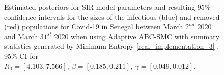 \documentclass[11pt,a4paper]{article}
\theoremstyle{break}
\begin{document}
  \begin{figure}[H]
    \centering
    \caption{Estimated posteriors for SIR model parameters and resulting 95\% confidence intervals for the sizes of the infectious (blue) and removed (red) populations for Covid-19 in Senegal between March $2^{nd}$ 2020 and March $31^{st}$ 2020 when using Adaptive ABC-SMC with summary statistics generated by Minimum Entropy \ref{real_implementation_3} . 95\% CI for $R_0=[4.103,7.566],\ \beta=[0.185,0.211],\ \gamma=[0.049,0.012]$.}
    \label{fig_senegal_me}
  \end{figure}
\end{document}
